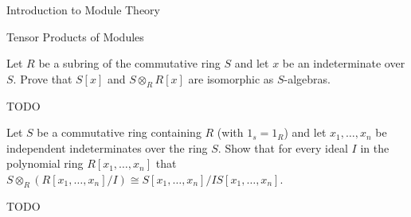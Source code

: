 \begin{chapter}{Introduction to Module Theory}
\begin{section}{Tensor Products of Modules}
\begin{solution}
\end{solution}\oneperpage



\begin{problem}\label{ex:10.4.25}
Let $R$ be a subring of the commutative ring $S$ and let $x$ be an indeterminate over $S$. Prove that $S[x]$ and $S\otimes_RR[x]$ are isomorphic as $S$-algebras.
\end{problem}
\begin{solution}TODO

\end{solution}\oneperpage



\begin{problem}\label{ex:10.4.26}
Let $S$ be a commutative ring containing $R$ (with $1_s = 1_R$) and let $x_1,\ldots,x_n$ be independent indeterminates over the ring $S$. Show that for every ideal $I$ in the polynomial ring $R[x_1,\ldots,x_n]$ that $S\otimes_R(R[x_1,\ldots,x_n]/I)\cong S[x_1,\ldots,x_n]/IS[x_1,\ldots,x_n]$. 
\end{problem}
\begin{solution}TODO

\end{solution}\oneperpage




\end{section}
\end{chapter}
